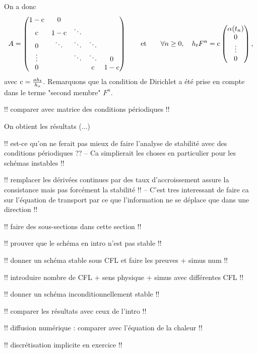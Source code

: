 \documentclass[12pt,a4paper,twoside]{article}
\begin{document}
On a donc 
\begin{align}
  A =
  \begin{pmatrix}
    1 - \mathrm{c} & 0 & & &
    \\
    \mathrm{c} & 1 - \mathrm{c} & \ddots & &
    \\
    0 & \ddots & \ddots & \ddots &
    \\
    \vdots & & \ddots & \ddots & 0
    \\
    0 & & & \mathrm{c} & 1-\mathrm{c}
  \end{pmatrix}
  \qquad \text{et} \qquad
  \forall n \geq 0,
  \quad h_t F^n = \mathrm{c}
  \begin{pmatrix}
    \alpha(t_n)
    \\
    0
    \\
    \vdots
    \\
    0
  \end{pmatrix}
  ,
\end{align}
avec $\mathrm{c} = \frac{a h_t}{h_x}$.
Remarquons que la condition de Dirichlet a \'et\'e prise en compte
dans le terme "second membre" $F^n$.


!! comparer avec matrice des conditions p\'eriodiques !!


On obtient les r\'esultats (...)

!! est-ce qu'on ne ferait pas mieux de faire l'analyse de stabilit\'e
avec des conditions p\'eriodiques ??
-- Ca simplierait les choses en particulier pour les sch\'emas instables !!


!! remplacer les d\'eriv\'ees continues par des taux d'accroissement
assure la consistance mais pas forc\'ement la stabilit\'e !!
-- C'est tres interessant de faire ca sur l'\'equation de transport par ce que 
l'information ne se d\'eplace que dans une direction !!

!! faire des sous-sections dans cette section !!

!! prouver que le sch\'ema en intro n'est pas stable !!

!! donner un sch\'ema stable sous CFL et faire les preuves + simus num !!

!! introduire nombre de CFL + sens physique + simus avec diff\'erentes CFL !!

!! donner un sch\'ema inconditionnellement stable !!

!! comparer les r\'esultats avec ceux de l'intro !!

!! diffusion num\'erique : comparer avec l'\'equation de la chaleur !!

!! discr\'etisation implicite en exercice !!
\end{document}
